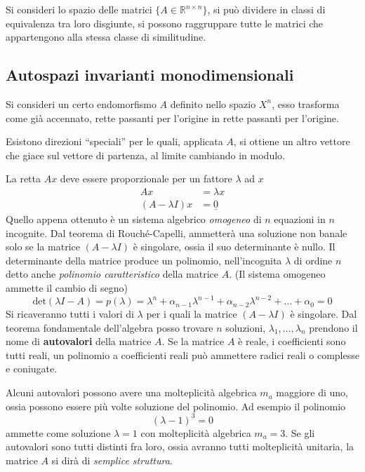 Si consideri lo spazio delle matrici $\{A\in\mathbb{R}^{n\times n}\}$,
si può dividere in classi di equivalenza tra loro disgiunte, si possono
raggruppare tutte le matrici che appartengono alla stessa classe di
similitudine.

\subsection{Autospazi invarianti monodimensionali}
Si consideri un certo endomorfismo $A$ definito nello spazio $X^n$, esso
trasforma come già accennato, rette passanti per l'origine in rette passanti
per l'origine.

Esistono direzioni ``speciali'' per le quali, applicata $A$, si ottiene un
altro vettore che giace sul vettore di partenza, al limite cambiando in modulo.

La retta $Ax$ deve essere proporzionale per un fattore $\lambda$ ad $x$
\begin{align}
Ax &= \lambda x\\
(A-\lambda I)x &= \underline{0}
\label{eq.:autovalori}\end{align}
Quello appena ottenuto è un sistema algebrico \textit{omogeneo} di $n$
equazioni in $n$ incognite.
Dal teorema di Rouché-Capelli, ammetterà una soluzione non banale solo se la
matrice $(A-\lambda I)$ è singolare, ossia il suo determinante è nullo.
Il determinante della matrice produce un polinomio, nell'incognita $\lambda$ di
ordine $n$ detto anche \textit{polinomio caratteristico}
della matrice $A$.
(Il sistema omogeneo ammette il cambio di segno)
$$
\text{det}(\lambda I -A) = p(\lambda) = \lambda^n + \alpha_{n-1}\lambda^{n-1} +
\alpha_{n-2}\lambda^{n-2} + \dots + \alpha_0 = 0
$$
Si ricaveranno tutti i valori di $\lambda$ per i quali la matrice
$(A-\lambda I)$ è singolare.
Dal teorema fondamentale dell'algebra posso trovare $n$ soluzioni,
$\lambda_1,\dots,\lambda_n $ prendono il nome di \textbf{autovalori} della
matrice $A$.
Se la matrice $A$ è reale, i coefficienti sono tutti reali, un polinomio a
coefficienti reali può ammettere radici reali o complesse e coniugate.

Alcuni autovalori possono avere una molteplicità algebrica $m_{a}$ maggiore di
uno, ossia possono essere più volte soluzione del polinomio.
Ad esempio il polinomio
$$
(\lambda-1)^{3} = 0
$$
ammette come soluzione $\lambda =1$ con molteplicità algebrica $m_a = 3$.
Se gli autovalori sono tutti distinti fra loro, ossia  avranno tutti
molteplicità unitaria, la matrice $A$ si dirà di \textit{semplice struttura}.

